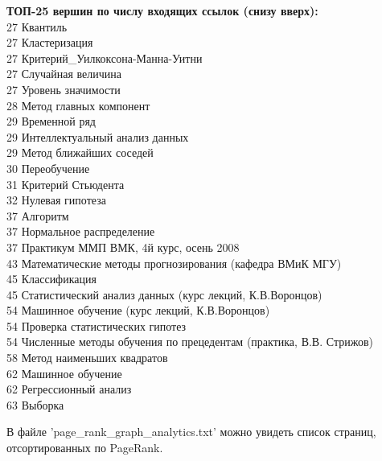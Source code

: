 \documentclass{article}
\begin{document}
\bigskip

 { \bf ТОП-25 вершин по числу входящих ссылок (снизу вверх):}\\
27 Квантиль\\
27 Кластеризация\\
27 Критерий\_Уилкоксона-Манна-Уитни\\
27 Случайная величина\\
27 Уровень значимости\\
28 Метод главных компонент\\
29 Временной ряд\\
29 Интеллектуальный анализ данных\\
29 Метод ближайших соседей\\
30 Переобучение\\
31 Критерий Стьюдента\\
32 Нулевая гипотеза\\
37 Алгоритм\\
37 Нормальное распределение\\
37 Практикум ММП ВМК, 4й курс, осень 2008\\
43 Математические методы прогнозирования (кафедра ВМиК МГУ)\\
45 Классификация\\
45 Статистический анализ данных (курс лекций, К.В.Воронцов)\\
54 Машинное обучение (курс лекций, К.В.Воронцов)\\
54 Проверка статистических гипотез\\
54 Численные методы обучения по прецедентам (практика, В.В. Стрижов)\\
58 Метод наименьших квадратов\\
62 Машинное обучение\\
62 Регрессионный анализ\\
63 Выборка\\

\bigskip

В файле 'page\_rank\_graph\_analytics.txt' можно увидеть список страниц, отсортированных по PageRank.

\bigskip
\end{document}
